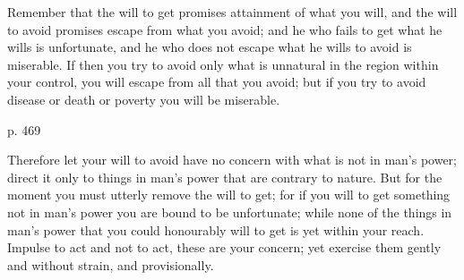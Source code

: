 Remember that  the will to  get promises attainment of  what you will,  and the
will to avoid promises escape from what you avoid; and he who fails to get what
he wills is unfortunate,  and he who does not escape what he  wills to avoid is
miserable. If then you try to avoid only what is unnatural in the region within
your control, you will escape from all that  you avoid; but if you try to avoid
disease or death or poverty you will be miserable.

p. 469

Therefore let  your will to  avoid have  no concern with  what is not  in man's
power; direct it only to things in man's power that are contrary to nature. But
for the moment you must utterly remove the  will to get; for if you will to get
something not in man's power you are bound to be unfortunate; while none of the
things in man's power that you could  honourably will to get is yet within your
reach. Impulse to act and not to act, these are your concern; yet exercise them
gently and without strain, and provisionally.
